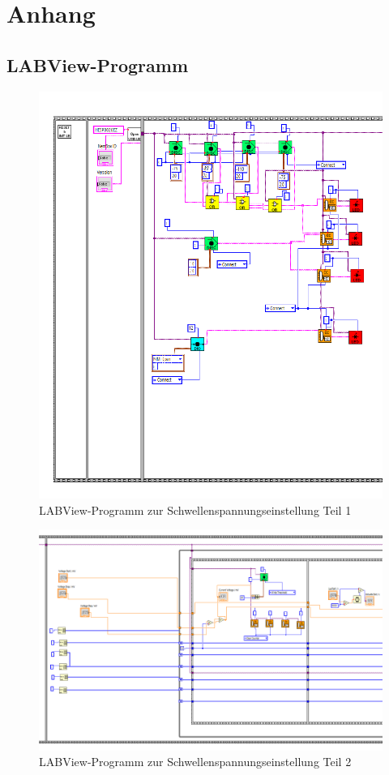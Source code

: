 \documentclass{article}
\begin{document}
\section{Anhang}

\subsection{LABView-Programm}
\begin{figure}[H]
    \centering
    \includegraphics[width=1\textwidth]{figures/ProgrammScreen1.png}
    \caption{LABView-Programm zur Schwellenspannungseinstellung Teil 1}
    \label{fig:LABView1}
\end{figure}
\begin{figure}[H]
    \centering
    \includegraphics[width=1\textwidth]{figures/ProgrammScreen2.png}
    \caption{LABView-Programm zur Schwellenspannungseinstellung Teil 2}
    \label{fig:LABView2}
\end{figure}
\end{document}
